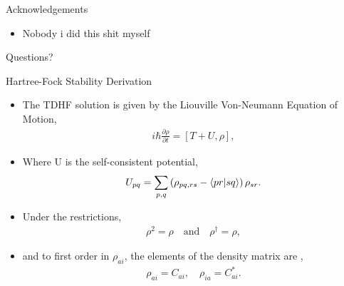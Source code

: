 \documentclass[10pt]{beamer}
\begin{document}
{{{{{{{{{{{{{
\begin{frame}{Acknowledgements}
  \begin{itemize}
    \item{ Nobody i did this shit myself }
 
  \end{itemize}
\end{frame}


{%
\begin{frame}[standout]
  Questions?
\end{frame}


\appendix



{%
\begin{frame}{Hartree-Fock Stability Derivation}
	\begin{itemize}[<+->]
		\item[]{The TDHF solution is given by the Liouville Von-Neumann Equation of Motion,
			\begin{eqnarray}
				i\hbar\frac{\partial \rho}{\partial t} = \left[ T+U, \rho \right],
			\end{eqnarray}
		}
		\item[]{Where U is the self-consistent potential,
			\begin{eqnarray}
				U_{pq} = \sum\limits_{p,q} \left(\rho_{pq,rs} - \braket{pr|sq} \right) \rho_{sr}.
			\end{eqnarray}
		}
		\item[]{Under the restrictions,
			\begin{eqnarray}
				\rho^2 = \rho \quad \textrm{and} \quad \rho^{\dagger} = \rho,
			\end{eqnarray}
		}
		\item[]{and to first order in $\rho_{ai}$, the elements of the density matrix are ,
			\begin{eqnarray}
				\rho_{ai} = C_{ai}, \quad \rho_{ia} = C_{ai}^*.
			\end{eqnarray}
		}
	\end{itemize}
\end{frame}

{%

}}}}}}}}}}}}}}}}
\end{document}
